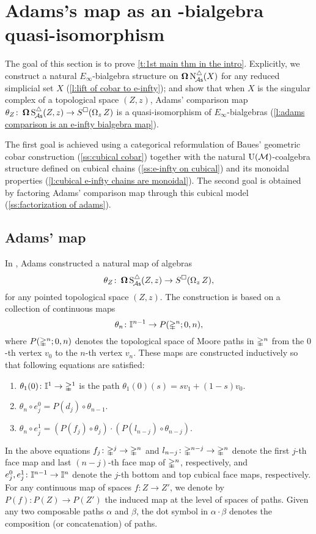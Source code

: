 
\section{Adams's map as an \pdfEinfty-bialgebra quasi-isomorphism} \label{s:theorem1}

The goal of this section is to prove \cref{t:1st main thm in the intro}.
Explicitly, we construct a natural $E_{\infty}$-bialgebra structure on $\operatorname{\mathbf{\Omega}} \operatorname{N^{\triangle}_{\!{\mathcal{A}\mathsf{s}}}}(X)$ for any reduced simplicial set $X$ (\cref{l:lift of cobar to e-infty}); and show that when $X$ is the singular complex of a topological space $(Z, z)$, Adams' comparison map $\theta_Z \colon \operatorname{\mathbf{\Omega}} \operatorname{S^{\triangle}_{\!{\mathcal{A}\mathsf{s}}}}(Z, z) \to S^{\square}(\operatorname{\Omega}_z Z)$ is a quasi-isomorphism of $E_\infty$-bialgebras (\cref{l:adams comparison is an e-infty bialgebra map}).

The first goal is achieved using a categorical reformulation of Baues' geometric cobar construction (\cref{ss:cubical cobar}) together with the natural ${\operatorname{U}(\mathcal{M})}$-coalgebra structure defined on cubical chains (\cref{ss:e-infty on cubical}) and its monoidal properties (\cref{l:cubical e-infty chains are monoidal}).
The second goal is obtained by factoring Adams' comparison map through this cubical model (\cref{ss:factorization of adams}).

\subsection{Adams' map}\label{adamsmaps}

In \cite{adams1956cobar}, Adams constructed a natural map of algebras
\begin{equation} \label{e:adams map 2}
\theta_Z \colon \operatorname{\mathbf{\Omega}} \operatorname{S^{\triangle}_{\!{\mathcal{A}\mathsf{s}}}}(Z, z) \to S^{\square}(\operatorname{\Omega}_z Z),
\end{equation}
for any pointed topological space $(Z, z)$.
The construction is based on a collection of continuous maps
\[
\theta_n \colon \mathbb{I}^{n-1} \to P(\mathbb{\Delta}^n;0,n),
\]
where $P(\mathbb{\Delta}^n;0,n)$ denotes the topological space of Moore paths in $\mathbb{\Delta}^n$ from the $0$-th vertex $v_0$ to the $n$-th vertex $v_n$.
These maps are constructed inductively so that following equations are satisfied:
\begin{enumerate}
	\item $\theta_1(0)\colon \mathbb{I}^1 \to \mathbb{\Delta}^1$ is the path $\theta_1(0)(s) = sv_1 +(1-s)v_0$.
	\item $\theta_n \circ e_j^0 = P(d_j) \circ \theta_{n-1}$.
	\item $\theta_n \circ e_j^1 = (P(f_j) \circ \theta_j) \cdot (P(l_{n-j}) \circ \theta_{n-j})$.
\end{enumerate}
In the above equations $f_j\colon \mathbb{\Delta}^j \rightarrow \mathbb{\Delta}^n$ and $l_{n-j}\colon \mathbb{\Delta}^{n-j} \rightarrow \mathbb{\Delta}^n$ denote the first $j$-th face map and last $(n-j)$-th face map of $\mathbb{\Delta}^n$, respectively, and
$e_j^0,e_j^1\colon \mathbb{I}^{n-1} \rightarrow \mathbb{I}^{n}$ denote the $j$-th bottom and top cubical face maps, respectively.
For any continuous map of spaces $f \colon Z \to Z'$, we denote by $P(f) \colon P(Z) \to P(Z')$ the induced map at the level of spaces of paths.
Given any two composable paths $\alpha$ and $\beta$, the dot symbol in $\alpha \cdot \beta$ denotes the composition (or concatenation) of paths.

